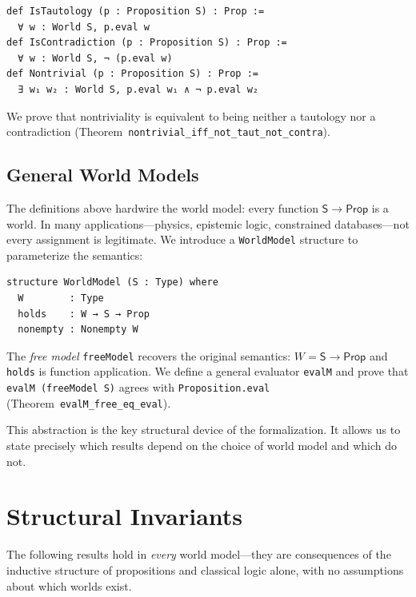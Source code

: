 \documentclass[10pt, letterpaper]{article}
\theoremstyle{definition}
\theoremstyle{remark}
\newcommand{\Sach}{\mathsf{S}}
\newcommand{\Prop}{\mathsf{Prop}}
\begin{document}
\begin{lstlisting}
def IsTautology (p : Proposition S) : Prop :=
  ∀ w : World S, p.eval w
def IsContradiction (p : Proposition S) : Prop :=
  ∀ w : World S, ¬ (p.eval w)
def Nontrivial (p : Proposition S) : Prop :=
  ∃ w₁ w₂ : World S, p.eval w₁ ∧ ¬ p.eval w₂
\end{lstlisting}

\noindent
We prove that nontriviality is equivalent to being neither a
tautology nor a contradiction
(Theorem~\texttt{nontrivial\_iff\_not\_taut\_not\_contra}).

\subsection{General World Models}
\label{sec:worldmodel}

The definitions above hardwire the world model: every function
$\Sach \to \Prop$ is a world.  In many applications---physics,
epistemic logic, constrained databases---not every assignment is
legitimate.  We introduce a \texttt{WorldModel} structure to
parameterize the semantics:

\begin{lstlisting}
structure WorldModel (S : Type) where
  W        : Type
  holds    : W → S → Prop
  nonempty : Nonempty W
\end{lstlisting}

\noindent
The \emph{free model} \texttt{freeModel} recovers the original
semantics: $W = \Sach \to \Prop$ and \texttt{holds} is function
application.  We define a general evaluator \texttt{evalM} and
prove that \texttt{evalM (freeModel S)} agrees with
\texttt{Proposition.eval} (Theorem~\texttt{evalM\_free\_eq\_eval}).

This abstraction is the key structural device of the
formalization.  It allows us to state precisely which results
depend on the choice of world model and which do not.

\section{Structural Invariants}
\label{sec:invariants}

The following results hold in \emph{every} world model---they
are consequences of the inductive structure of propositions and
classical logic alone, with no assumptions about which worlds
exist.
\end{document}
